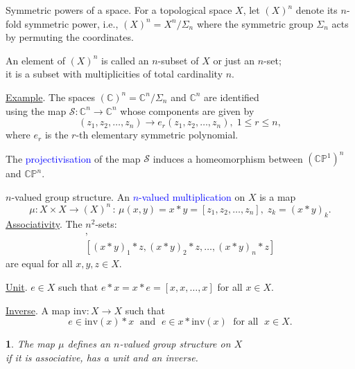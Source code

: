 \documentclass{beamer}
\newtheorem*{fr}{}
\def\blue#1{\textcolor{blue}{#1}}
\begin{document}
\begin{frame}{Symmetric powers of a space.}
For a topological space $X$, let $(X)^n$ denote its $n$-fold
symmetric power, i.e., $(X)^n=X^n/\Sigma_n$ where the symmetric group $\Sigma_n$ acts by permuting the coordinates.
\vspace{0.2cm}

An element of $(X)^n$ is called an $n$-subset of $X$ or just an $n$-set;\\
it is a subset with multiplicities of total cardinality $n$.
\vspace{0.2cm}

\underline{Example}. The spaces $(\mathbb{C})^n=\mathbb{C}^n/\Sigma_n$
and $\mathbb{C}^n$ are identified\\ using the map $\mathcal{S}:\mathbb{C}^n\to\mathbb{C}^n$
whose components are given by
\[
(z_1,z_2,\dots,z_n)\to e_r(z_1,z_2,\dots,z_n),\; 1\leqslant r\leqslant n,
\]
where $e_r$ is the $r$-th elementary symmetric polynomial.
\vspace{0.2cm}

The \blue{projectivisation} of the map $\mathcal{S}$ induces a
homeomorphism between $(\mathbb{CP}^1)^n$ and $\mathbb{CP}^n.$
\end{frame}




\begin{frame}{$n$-valued group structure.}
An \blue{$n$-valued multiplication} on $X$ is a map
\[
\mu: X\times X \to (X)^n\,:\,\mu(x,y)=x*y=[z_1,z_2,\dots, z_n], \; z_k=(x*y)_k.
\]
\underline{Associativity}. The $n^2$-sets:
\begin{gather*}[x*(y*z)_1,x*(y*z)_2,\dots,x*(y*z)_n],\\
[(x*y)_1*z,(x*y)_2*z,\dots,(x*y)_n*z]
\end{gather*}
are equal for all $x,y,z\in X$.\\
\vspace{0.2cm}

\underline{Unit}. $e\in X$ such that\; $e*x=x*e=[x,x,\dots,x]$\; for all\; $x\in X$.\\
\vspace{0.2cm}

\underline{Inverse}. A map $\mathrm{inv}\colon X\to X$ such that
\vspace{-0.4cm}
\[
e\in \mathrm{inv}(x)* x\; \text{ and }\; e \in x*\mathrm{inv}(x)\;\text{ for all }\; x\in X.
\]
\vspace{-0.5cm}
\begin{fr}
The map $\mu$ defines an $n$-valued group structure on $X$ \\
if it is associative, has a unit and an inverse.
\end{fr}
\end{frame}
\end{document}
